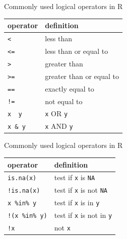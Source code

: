 \documentclass[
  ignorenonframetext,
]{beamer}
\begin{document}
\begin{frame}[fragile]{Commonly used logical operators in R}
\protect\hypertarget{commonly-used-logical-operators-in-r}{}
\begin{longtable}[]{@{}ll@{}}
\toprule
operator & definition \\
\midrule
\endhead
\texttt{\textless{}} & less than \\
\texttt{\textless{}=} & less than or equal to \\
\texttt{\textgreater{}} & greater than \\
\texttt{\textgreater{}=} & greater than or equal to \\
\texttt{==} & exactly equal to \\
\texttt{!=} & not equal to \\
\texttt{x\ \textbar{}\ y} & \texttt{x} OR \texttt{y} \\
\texttt{x\ \&\ y} & \texttt{x} AND \texttt{y} \\
\bottomrule
\end{longtable}
\end{frame}

\begin{frame}[fragile]{Commonly used logical operators in R}
\protect\hypertarget{commonly-used-logical-operators-in-r-1}{}
\begin{longtable}[]{@{}ll@{}}
\toprule
operator & definition \\
\midrule
\endhead
\texttt{is.na(x)} & test if \texttt{x} is \texttt{NA} \\
\texttt{!is.na(x)} & test if \texttt{x} is not \texttt{NA} \\
\texttt{x\ \%in\%\ y} & test if \texttt{x} is in \texttt{y} \\
\texttt{!(x\ \%in\%\ y)} & test if \texttt{x} is not in \texttt{y} \\
\texttt{!x} & not \texttt{x} \\
\bottomrule
\end{longtable}
\end{frame}
\end{document}
